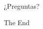 \documentclass[10pt,presentation]{beamer}
\begin{document}
\begin{frame}
\Huge{\centerline{¿Preguntas?}}
\end{frame}

\begin{frame}
\Huge{\centerline{The End}}
\end{frame}
\end{document}
